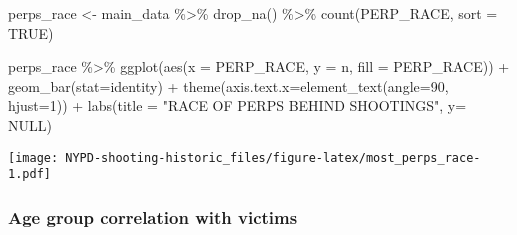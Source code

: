 \documentclass[
]{article}
\newenvironment{Shaded}{\begin{snugshade}}{\end{snugshade}}
\newcommand{\AttributeTok}[1]{\textcolor[rgb]{0.77,0.63,0.00}{#1}}
\newcommand{\ConstantTok}[1]{\textcolor[rgb]{0.00,0.00,0.00}{#1}}
\newcommand{\DecValTok}[1]{\textcolor[rgb]{0.00,0.00,0.81}{#1}}
\newcommand{\FunctionTok}[1]{\textcolor[rgb]{0.00,0.00,0.00}{#1}}
\newcommand{\NormalTok}[1]{#1}
\newcommand{\OtherTok}[1]{\textcolor[rgb]{0.56,0.35,0.01}{#1}}
\newcommand{\SpecialCharTok}[1]{\textcolor[rgb]{0.00,0.00,0.00}{#1}}
\newcommand{\StringTok}[1]{\textcolor[rgb]{0.31,0.60,0.02}{#1}}
\begin{document}
\begin{Shaded}
\begin{Highlighting}[]
\NormalTok{perps\_race }\OtherTok{\textless{}{-}}\NormalTok{ main\_data }\SpecialCharTok{\%\textgreater{}\%} \FunctionTok{drop\_na}\NormalTok{() }\SpecialCharTok{\%\textgreater{}\%} \FunctionTok{count}\NormalTok{(PERP\_RACE, }\AttributeTok{sort =} \ConstantTok{TRUE}\NormalTok{)}

\NormalTok{perps\_race }\SpecialCharTok{\%\textgreater{}\%} \FunctionTok{ggplot}\NormalTok{(}\FunctionTok{aes}\NormalTok{(}\AttributeTok{x =}\NormalTok{ PERP\_RACE, }\AttributeTok{y =}\NormalTok{ n, }\AttributeTok{fill =}\NormalTok{ PERP\_RACE)) }\SpecialCharTok{+} \FunctionTok{geom\_bar}\NormalTok{(}\AttributeTok{stat=}\StringTok{\textquotesingle{}identity\textquotesingle{}}\NormalTok{) }\SpecialCharTok{+} \FunctionTok{theme}\NormalTok{(}\AttributeTok{axis.text.x=}\FunctionTok{element\_text}\NormalTok{(}\AttributeTok{angle=}\DecValTok{90}\NormalTok{, }\AttributeTok{hjust=}\DecValTok{1}\NormalTok{)) }\SpecialCharTok{+} \FunctionTok{labs}\NormalTok{(}\AttributeTok{title =} \StringTok{"RACE OF PERPS BEHIND SHOOTINGS"}\NormalTok{, }\AttributeTok{y=} \ConstantTok{NULL}\NormalTok{)}
\end{Highlighting}
\end{Shaded}

\texttt{[image: NYPD-shooting-historic\_files/figure-latex/most\_perps\_race-1.pdf]}

\hypertarget{age-group-correlation-with-victims}{%
\subsubsection{Age group correlation with
victims}\label{age-group-correlation-with-victims}}
\end{document}
